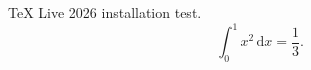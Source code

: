 \documentclass{article}
\begin{document}
TeX Live 2026 installation test.
\[
  \int_0^1 x^2\,\mathrm{d}x = \frac{1}{3}.
\]
\end{document}
